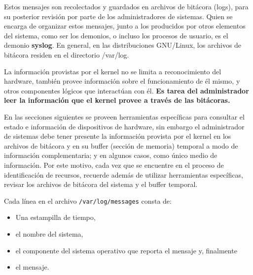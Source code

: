 \documentclass[12pt]{article}
\begin{document}
Estos mensajes son recolectados y guardados en archivos de bitácora (logs), para su posterior 
revisión por parte de los administradores de sistemas. Quien se encarga de organizar estos 
mensajes, junto a los producidos por otros elementos del sistema, como ser los demonios, o 
incluso los procesos de usuario, es el demonio {\bf syslog}. En general, en las distribuciones
GNU/Linux, los archivos de bitácora residen en el directorio /var/log. 

La información provistas por el kernel no se limita a reconocimiento del hardware, también 
provee información sobre el funcionamiento de él mismo, y otros componentes lógicos que 
interactúan con él. 
\textbf{Es tarea del administrador leer la información que el kernel provee a través 
de las bitácoras.}

En las secciones siguientes se proveen herramientas específicas para consultar el estado 
e información de dispositivos de hardware, sin embargo el administrador de sistemas debe
tener presente la información provista por el kernel en los archivos de bitácora y en su 
buffer (sección de memoria) temporal a modo de información complementaria; y en algunos 
casos, como único medio de información. Por este motivo, cada vez que se encuentre en el 
proceso de identificación de recursos, recuerde además de utilizar herramientas 
específicas, revisar los archivos de bitácora del sistema y el buffer temporal. 



Cada línea en el archivo \texttt{/var/log/messages} consta de:
\begin{itemize} 
\item Una estampilla de tiempo, 
\item el nombre del sistema, 
\item el componente del sistema operativo que reporta el mensaje y, finalmente 
\item el mensaje. 
\end{itemize}
\end{document}
